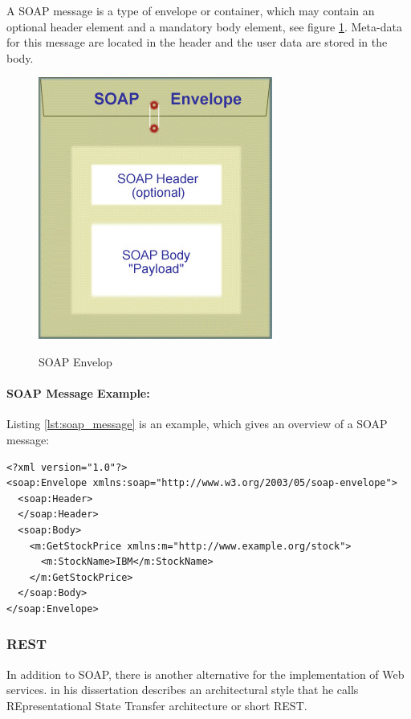A \ac{SOAP} message is a type of envelope or container, which may contain an optional header element and a mandatory body element, see figure \ref{fig:soap_env}. Meta-data for this message are located in the header and the user data are stored in the body.

\begin{figure}[htb]
  \centering
  \includegraphics[scale=0.5]{soap_envelope.jpg}\\
  \caption{\ac{SOAP} Envelop}
  \label{fig:soap_env}
  \protect\cite{oracle_soap}
\end{figure}

\paragraph{\ac{SOAP} Message Example:}

Listing \ref{lst:soap_message} is an example, which gives an overview of a \ac{SOAP} message:

\begin{code}
\begin{verbatim}
<?xml version="1.0"?>
<soap:Envelope xmlns:soap="http://www.w3.org/2003/05/soap-envelope">
  <soap:Header>
  </soap:Header>
  <soap:Body>
    <m:GetStockPrice xmlns:m="http://www.example.org/stock">
      <m:StockName>IBM</m:StockName>
    </m:GetStockPrice>
  </soap:Body>
</soap:Envelope>
\end{verbatim}
\caption{\ac{SOAP} message example}
\label{lst:soap_message}
\end{code}

\subsubsection{\ac{REST}\label{sec:back_tech_ws_rest}}
In addition to \ac{SOAP}, there is another alternative for the implementation of Web services. \citeauthor{Fielding2000} in his dissertation describes an architectural style that he calls REpresentational State Transfer architecture or short \ac{REST}.

